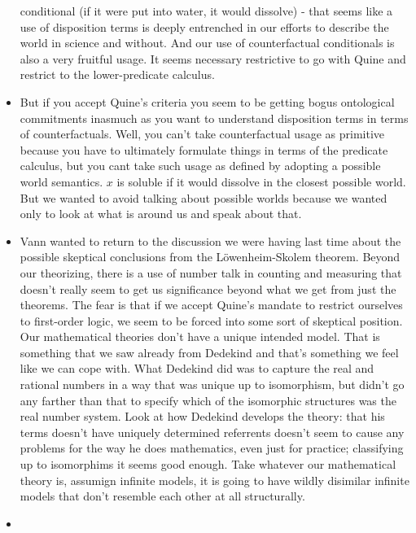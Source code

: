 \documentclass[12pt]{article}
\theoremstyle{definition}
\begin{document}
\begin{itemize}
        conditional (if it were put into water, it would dissolve) - that seems
        like a use of disposition terms is deeply entrenched in our efforts to
        describe the world in science and without. And our use of
        counterfactual conditionals is also a very fruitful usage. It seems
        necessary restrictive to go with Quine and restrict to the
        lower-predicate calculus.
    \item
        But if you accept Quine's criteria you seem to be getting bogus
        ontological commitments inasmuch as you want to understand disposition
        terms in terms of counterfactuals. Well, you can't take counterfactual
        usage as primitive because you have to ultimately formulate things in
        terms of the predicate calculus, but you cant take such usage as
        defined by adopting a possible world semantics. $x$ is soluble if it
        would dissolve in the closest possible world. But we wanted to avoid
        talking about possible worlds because we wanted only to look at what is
        around us and speak about that.
    \item
        Vann wanted to return to the discussion we were having last time about
        the possible skeptical conclusions from the L\"owenheim-Skolem theorem.
        Beyond our theorizing, there is a use of number talk in counting and
        measuring that doesn't really seem to get us significance beyond what
        we get from just the theorems. The fear is that if we accept Quine's
        mandate to restrict ourselves to first-order logic, we seem to be
        forced into some sort of skeptical position. Our mathematical theories
        don't have a unique intended model. That is something that we saw
        already from Dedekind and that's something we feel like we can cope
        with. What Dedekind did was to capture the real and rational numbers in
        a way that was unique up to isomorphism, but didn't go any farther than
        that to specify which of the isomorphic structures was the real number
        system. Look at how Dedekind develops the theory: that his terms
        doesn't have uniquely determined referrents doesn't seem to cause any
        problems for the way he does mathematics, even just for practice;
        classifying up to isomorphims it seems good enough. Take whatever our
        mathematical theory is, assumign infinite models, it is going to have
        wildly disimilar infinite models that don't resemble each other at all
        structurally.
    \item

\end{itemize}
\end{document}
